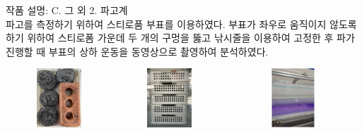 \documentclass[Junlampaper, portrait]{Junlam_PosterK}
\begin{document}
\begin{poster}
\begin{posterbox}[name=wmaker,column=2, below=wtank] {작품 설명: C. 그 외}
\small{2. 파고계\\}
    \scriptsize {
    파고를 측정하기 위하여 스티로품 부표를 이용하였다. 부표가 좌우로 움직이지 않도록 하기 위하여 스티로폼 가운데 두 개의 구멍을 뚫고 낚시줄을 이용하여 고정한 후 파가 진행할 때 부표의 상하 운동을 동영상으로 촬영하여 분석하였다.}
    
        \includegraphics[width=0.3\textwidth, height=2.2cm]{images/sopagi2.jpg}
        \includegraphics[width=0.3\textwidth, height=2.2cm]{images/sopagi1.jpg}
        \includegraphics[width=0.375\textwidth, height=2.2cm]{images/Wave_Gauge.jpg}
        \label{wave absorb} 
    

\end{posterbox}
\end{poster}
\end{document}
